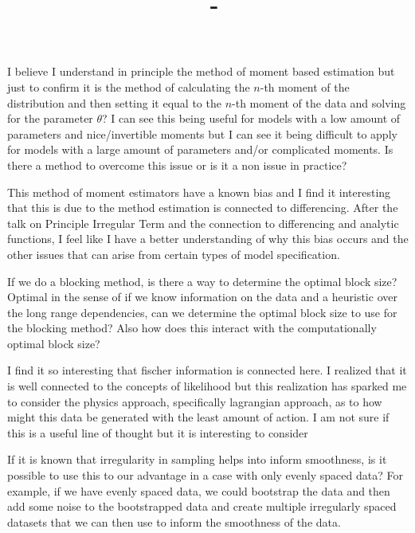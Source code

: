 \documentclass[answers,12pt,addpoints]{exam}
\author{\name}
\title{\course \ - \assignment}
\begin{document}
\maketitle

\newpage
\begin{questions}
\question I believe I understand in principle the method of moment based estimation but just to confirm it is the method of calculating the $n$-th moment of the distribution and then setting it equal to the $n$-th moment of the data and solving for the parameter $\theta$? I can see this being useful for models with a low amount of parameters and nice/invertible moments but I can see it being difficult to apply for models with a large amount of parameters and/or complicated moments. Is there a method to overcome this issue or is it a non issue in practice?

\question This method of moment estimators have a known bias and I find it interesting that this is due to the method estimation is connected to differencing. After the talk on Principle Irregular Term and the connection to differencing and analytic functions, I feel like I have a better understanding of why this bias occurs and the other issues that can arise from certain types of model specification. 

\question If we do a blocking method, is there a way to determine the optimal block size? Optimal in the sense of if we know information on the data and a heuristic over the long range dependencies, can we determine the optimal block size to use for the blocking method? Also how does this interact with the computationally optimal block size?

\question I find it so interesting that fischer information is connected here. I realized that it is well connected to the concepts of likelihood but this realization has sparked me to consider the physics approach, specifically lagrangian approach, as to how might this data be generated with the least amount of action. I am not sure if this is a useful line of thought but it is interesting to consider 

\question If it is known that irregularity in sampling helps into inform smoothness, is it possible to use this to our advantage in a case with only evenly spaced data? For example, if we have evenly spaced data, we could bootstrap the data and then add some noise to the bootstrapped data and create multiple irregularly spaced datasets that we can then use to inform the smoothness of the data. 



\end{questions}
\end{document}
